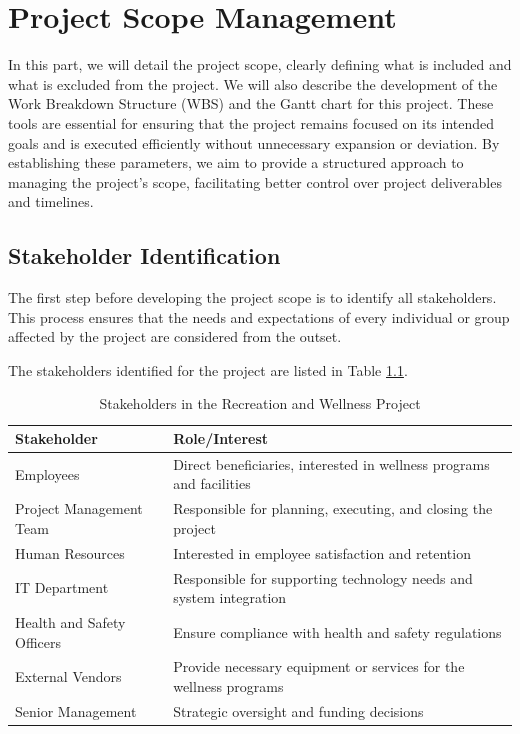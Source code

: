 \chapter{Project Scope Management}

In this part, we will detail the project scope, clearly defining what is included and what is excluded from the project. We will also describe the development of the Work Breakdown Structure (WBS) and the Gantt chart for this project. These tools are essential for ensuring that the project remains focused on its intended goals and is executed efficiently without unnecessary expansion or deviation. By establishing these parameters, we aim to provide a structured approach to managing the project's scope, facilitating better control over project deliverables and timelines.


\section{Stakeholder Identification}
The first step before developing the project scope is to identify all stakeholders. This process ensures that the needs and expectations of every individual or group affected by the project are considered from the outset.

The stakeholders identified for the project are listed in Table \ref{tab:stakeholders}.


\begin{table}[h]
\centering
\caption{Stakeholders in the Recreation and Wellness Project}
\label{tab:stakeholders}
\begin{tabular}{|m{4cm}|m{8cm}|}
\hline
\textbf{Stakeholder} & \textbf{Role/Interest} \\
\hline
Employees & Direct beneficiaries, interested in wellness programs and facilities \\
\hline
Project Management Team & Responsible for planning, executing, and closing the project \\
\hline
Human Resources & Interested in employee satisfaction and retention \\
\hline
IT Department & Responsible for supporting technology needs and system integration \\
\hline
Health and Safety Officers & Ensure compliance with health and safety regulations \\
\hline
External Vendors & Provide necessary equipment or services for the wellness programs \\
\hline
Senior Management & Strategic oversight and funding decisions \\
\hline
\end{tabular}
\end{table}


